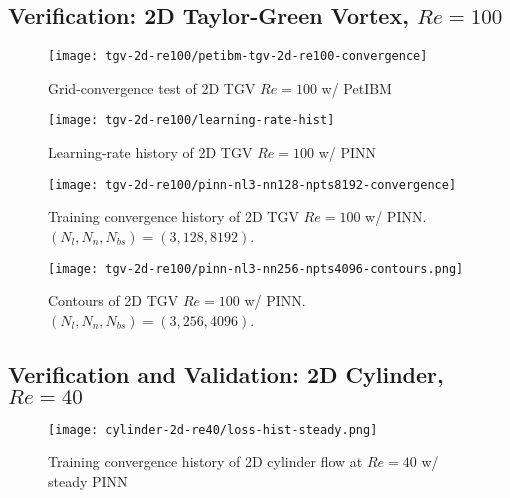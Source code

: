 
\lipsum[1]

\subsection{Verification: 2D Taylor-Green Vortex, $Re=\num{100}$}

\lipsum[1]

\begin{figure}[!hbt]
    \centering%
    \texttt{[image: tgv-2d-re100/petibm-tgv-2d-re100-convergence]}%
    \caption{%
        Grid-convergence test of 2D TGV $Re=\num{100}$ w/ PetIBM
    }
    \label{fig:tgv-petibm-convergence}%
\end{figure}

\lipsum[1]

\begin{figure}[!hbt]
    \centering%
    \texttt{[image: tgv-2d-re100/learning-rate-hist]}%
    \caption{%
        Learning-rate history of 2D TGV $Re=\num{100}$ w/ PINN
    }
    \label{fig:tgv-learning-rate-hist}%
\end{figure}

\lipsum[1]

\begin{figure}[!hbt]
    \centering%
    \texttt{[image: tgv-2d-re100/pinn-nl3-nn128-npts8192-convergence]}%
    \caption{%
        Training convergence history of 2D TGV $Re=\num{100}$ w/ PINN.
        $(N_l, N_n, N_{bs})=(3, 128, 8192)$.
    }
    \label{fig:tgv-pinn-loss}%
\end{figure}

\lipsum[1]

\begin{figure}[!hbt]
    \centering%
    \texttt{[image: tgv-2d-re100/pinn-nl3-nn256-npts4096-contours.png]}%
    \caption{%
        Contours of 2D TGV $Re=\num{100}$ w/ PINN. 
        $(N_l, N_n, N_{bs})=(3, 256, 4096)$.
    }
    \label{fig:tgv-pinn-contours}%
\end{figure}

\lipsum[1]

\subsection{Verification and Validation: 2D Cylinder, $Re=\num{40}$}

\lipsum[1]

\begin{figure}[!hbt]
    \centering%
    \texttt{[image: cylinder-2d-re40/loss-hist-steady.png]}%
    \caption{%
        Training convergence history of 2D cylinder flow at $Re=\num{40}$ w/ steady PINN
    }
    \label{fig:cylinder-re40-steady-pinn-loss}%
\end{figure}

